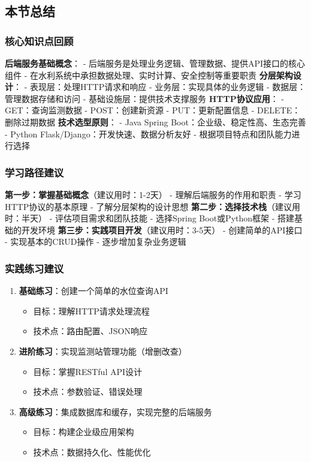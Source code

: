 \subsection{本节总结}\label{ux672cux8282ux603bux7ed3}
\subsubsection{核心知识点回顾}\label{ux6838ux5fc3ux77e5ux8bc6ux70b9ux56deux987e} \textbf{后端服务基础概念}： -
后端服务是处理业务逻辑、管理数据、提供API接口的核心组件 - 在水利系统中承担数据处理、实时计算、安全控制等重要职责 \textbf{分层架构设计}： - 表现层：处理HTTP请求和响应 - 业务层：实现具体的业务逻辑 -
数据层：管理数据存储和访问 - 基础设施层：提供技术支撑服务 \textbf{HTTP协议应用}： - GET：查询监测数据 - POST：创建新资源 - PUT：更新配置信息 - DELETE：删除过期数据
\textbf{技术选型原则}： - Java Spring Boot：企业级、稳定性高、生态完善 - Python Flask/Django：开发快速、数据分析友好 - 根据项目特点和团队能力进行选择
\subsubsection{学习路径建议}\label{ux5b66ux4e60ux8defux5f84ux5efaux8bae-1} \textbf{第一步：掌握基础概念}（建议用时：1-2天） - 理解后端服务的作用和职责 -
学习HTTP协议的基本原理 - 了解分层架构的设计思想 \textbf{第二步：选择技术栈}（建议用时：半天） - 评估项目需求和团队技能 - 选择Spring Boot或Python框架 - 搭建基础的开发环境
\textbf{第三步：实践项目开发}（建议用时：3-5天） - 创建简单的API接口 - 实现基本的CRUD操作 - 逐步增加复杂业务逻辑
\subsubsection{实践练习建议}\label{ux5b9eux8df5ux7ec3ux4e60ux5efaux8bae} \begin{enumerate} \def\labelenumi{\arabic{enumi}.}
\tightlist \item \textbf{基础练习}：创建一个简单的水位查询API \begin{itemize} \tightlist \item 目标：理解HTTP请求处理流程 \item 技术点：路由配置、JSON响应
\end{itemize} \item \textbf{进阶练习}：实现监测站管理功能（增删改查） \begin{itemize} \tightlist \item 目标：掌握RESTful API设计 \item
技术点：参数验证、错误处理 \end{itemize} \item \textbf{高级练习}：集成数据库和缓存，实现完整的后端服务 \begin{itemize} \tightlist \item 目标：构建企业级应用架构 \item
技术点：数据持久化、性能优化 \end{itemize} \end{enumerate}
